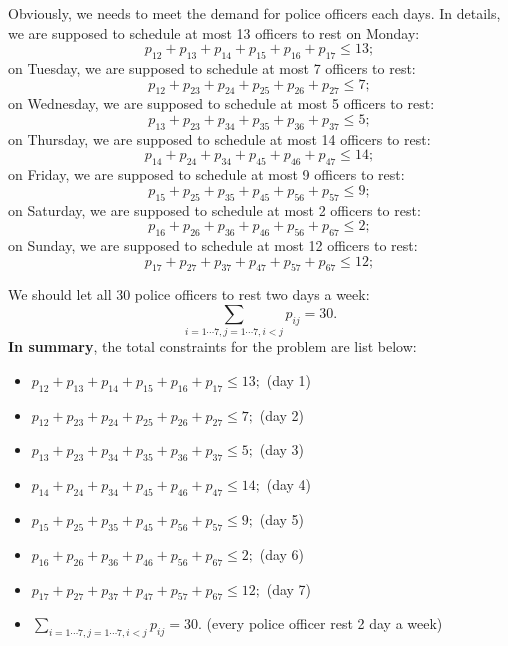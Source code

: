 \documentclass[12pt]{article}
\begin{document}
	Obviously, we needs to meet the demand for police officers each days. In details, we are supposed to schedule at most 13 officers to rest on Monday:
	\begin{equation}
	p_{12}+p_{13}+p_{14}+p_{15}+p_{16}+p_{17}\le13;
	\end{equation}
	on Tuesday, we are supposed to schedule at most 7 officers to rest:
	\begin{equation}
		p_{12}+p_{23}+p_{24}+p_{25}+p_{26}+p_{27}\le7;
		\end{equation}
	on Wednesday, we are supposed to schedule at most 5 officers to rest:
	\begin{equation}
		p_{13}+p_{23}+p_{34}+p_{35}+p_{36}+p_{37}\le5;
		\end{equation}
	on Thursday, we are supposed to schedule at most 14 officers to rest:
	\begin{equation}
		p_{14}+p_{24}+p_{34}+p_{45}+p_{46}+p_{47}\le14;
		\end{equation}
	on Friday, we are supposed to schedule at most 9 officers to rest:
		\begin{equation}
			p_{15}+p_{25}+p_{35}+p_{45}+p_{56}+p_{57}\le9;
		\end{equation}
	on Saturday, we are supposed to schedule at most 2 officers to rest:
		\begin{equation}
			p_{16}+p_{26}+p_{36}+p_{46}+p_{56}+p_{67}\le2;
		\end{equation}
	on Sunday, we are supposed to schedule at most 12 officers to rest:
		\begin{equation}
			p_{17}+p_{27}+p_{37}+p_{47}+p_{57}+p_{67}\le12;
		\end{equation}

	\noindent We should let all 30 police officers to rest two days a week:
	\begin{equation}
		\sum\limits_{i=1\cdots7,j=1\cdots7,i<j}p_{ij}=30.
	\end{equation}
	\textbf{In summary}, the total constraints for the problem are list below:
	\begin{itemize}
		\item$p_{12}+p_{13}+p_{14}+p_{15}+p_{16}+p_{17}\le13;$ (day 1) 
		\item $p_{12}+p_{23}+p_{24}+p_{25}+p_{26}+p_{27}\le7;$ (day 2)
		\item $p_{13}+p_{23}+p_{34}+p_{35}+p_{36}+p_{37}\le5;$ (day 3)
		\item $p_{14}+p_{24}+p_{34}+p_{45}+p_{46}+p_{47}\le14;$ (day 4)
		\item $p_{15}+p_{25}+p_{35}+p_{45}+p_{56}+p_{57}\le9;$ (day 5)
		\item $p_{16}+p_{26}+p_{36}+p_{46}+p_{56}+p_{67}\le2;$ (day 6)
		\item $p_{17}+p_{27}+p_{37}+p_{47}+p_{57}+p_{67}\le12;$ (day 7)
		\item $\sum\limits_{i=1\cdots7,j=1\cdots7,i<j}p_{ij}=30.$ (every police officer rest 2 day a week)
	\end{itemize}
\end{document}
